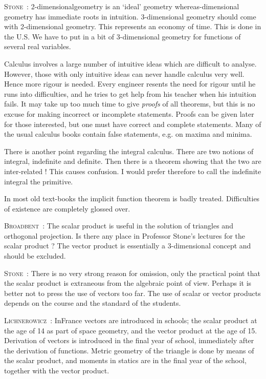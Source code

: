 \smallskip
\noindent
\textsc{Stone}~: 2-dimensional\pageoriginale geometry is an `ideal'
geometry whereas-dimensional geometry has immediate roots in
intuition. 3-dimensional geometry should come with 2-dimensional
geometry. This represents an economy of time. This is done in the
U.S. We have to put in a bit of 3-dimensional geometry for functions
of several real variables. 

Calculus involves a large number of intuitive ideas which are difficult to analyse. However, those with only intuitive ideas can never handle calculus very well. Hence more rigour is needed. Every engineer resents the need for rigour until he runs into difficulties, and he tries to get help from his teacher when his intuition fails. It may take up too much time to give {\em proofs} of all theorems, but this is no excuse for making incorrect or incomplete statements. Proofs can be given later for those interested, but one must have correct and complete statements. Many of the usual calculus books contain false statements, e.g. on maxima and minima.

There is another point regarding the integral calculus. There are two notions of integral, indefinite and definite. Then there is a theorem showing that the two are inter-related ! This causes confusion. I would prefer therefore to call the indefinite integral the primitive.

In most old text-books the implicit function theorem is badly treated. Difficulties of existence are completely glossed over.

\smallskip
\noindent
\textsc{Broadbent}~: The scalar product is useful in the solution of triangles and orthogonal projection. Is there any place in Professor Stone's lectures for the scalar product ? The vector product is essentially a 3-dimensional concept and should be excluded.

\smallskip
\noindent
\textsc{Stone}~: There is no very strong reason for omission, only the practical point that the scalar product is extraneous from the algebraic point of view. Perhaps it is better not to press the use of vectors too far. The use of scalar or vector products depends on the course and the standard of the students.

\smallskip
\noindent
\textsc{Lichnerowicz}~: In\pageoriginale France vectors are introduced in schools; the scalar product at the age of 14 as part of space geometry, and the vector product at the age of 15. Derivation of vectors is introduced in the final year of school, immediately after the derivation of functions. Metric geometry of the triangle is done by means of the scalar product, and moments in statics are in the final year of the school, together with the vector product.

